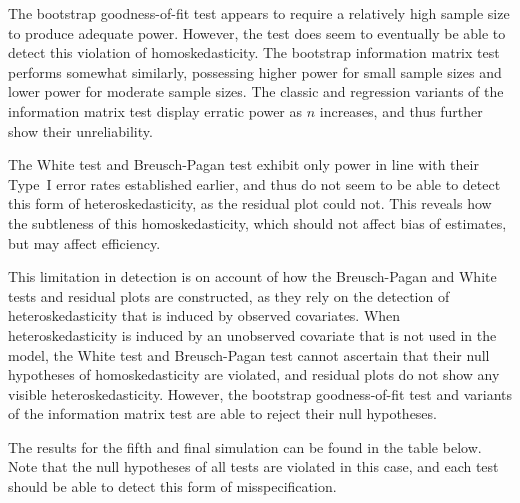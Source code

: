 \documentclass[submit]{smj}
\begin{document}
The bootstrap goodness-of-fit test appears to require a relatively high sample size to produce adequate power. However, the test does seem to eventually be able to detect this violation of homoskedasticity.
The bootstrap information matrix test performs somewhat similarly, possessing higher power for small sample sizes and lower power for moderate sample sizes. The classic and regression variants of the information
matrix test display erratic power as $n$ increases, and thus further show their unreliability.

The White test and Breusch-Pagan test exhibit only power in line with their Type~I error rates established earlier, and thus do not seem to be able to detect this form of heteroskedasticity,
as the residual plot could not. This reveals how the subtleness of this homoskedasticity, which should not affect bias of estimates, but may affect efficiency.

This limitation in detection is on account of how the Breusch-Pagan and White tests and residual plots are constructed, as they rely on the detection of heteroskedasticity that is induced by observed covariates.
When heteroskedasticity is induced by an unobserved covariate that is not used in the model, the White test and Breusch-Pagan test cannot ascertain that their
null hypotheses of homoskedasticity are violated, and residual plots do not show any visible heteroskedasticity. However, the bootstrap goodness-of-fit test and variants of the information matrix test are able to
reject their null hypotheses.

The results for the fifth and final simulation can be found in the table below. Note that the null hypotheses of all tests are violated in this case, and each test should be able to detect this form of misspecification.

\begin{table}[H]
	\centering
	\small\addtolength{\tabcolsep}{-3pt}
	\setlength\extrarowheight{-3pt}
	{
	}
	\end{table}
\end{document}
